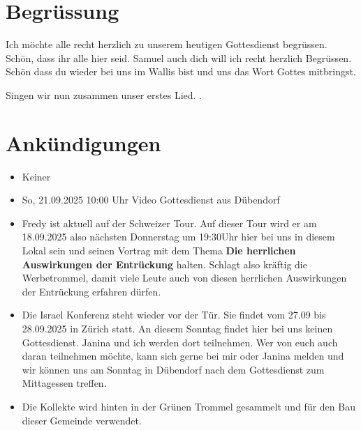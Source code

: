 \documentclass{../../inc/mybib}
\begin{document}
\section{Begrüssung}
Ich möchte alle recht herzlich zu unserem heutigen Gottesdienst begrüssen. Schön, dass ihr alle hier seid. Samuel auch dich will ich recht herzlich Begrüssen. Schön dass du wieder bei uns im Wallis bist und uns das Wort Gottes mitbringst. 

\beten{}

Singen wir nun zusammen unser erstes Lied.
{}.

\section{Ankündigungen}
\begin{itemize}
    \item {} Keiner
    \item {} So, 21.09.2025 10:00 Uhr Video Gottesdienst aus Dübendorf
    \item {} Fredy ist aktuell auf der Schweizer Tour. Auf dieser Tour wird er am 18.09.2025 also nächsten Donnerstag um 19:30Uhr hier bei uns in diesem Lokal sein und seinen Vortrag mit dem Thema \textbf{Die herrlichen Auswirkungen der Entrückung} halten. Schlagt also kräftig die Werbetrommel, damit viele Leute auch von diesen herrlichen Auswirkungen der Entrückung erfahren dürfen.
    \item {} Die Israel Konferenz steht wieder vor der Tür. Sie findet vom 27.09 bis 28.09.2025 in Zürich statt. An diesem Sonntag findet hier bei uns keinen Gottesdienst. Janina und ich werden dort teilnehmen. Wer von euch auch daran teilnehmen möchte, kann sich gerne bei mir oder Janina melden und wir können uns am Sonntag in Dübendorf nach dem Gottesdienst zum Mittagessen treffen.
    \item Die Kollekte wird hinten in der Grünen Trommel gesammelt und für den Bau dieser Gemeinde verwendet.
\end{itemize}
\end{document}
